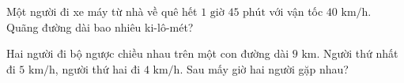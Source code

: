 \begin{ex}
  Một người đi xe máy từ nhà về quê hết $1\text{ giờ } 45\text{ phút}$ với vận tốc $40\text{ km/h}$. Quãng đường dài bao nhiêu ki-lô-mét?
\end{ex}

\begin{ex}
  Hai người đi bộ ngược chiều nhau trên một con đường dài $9\text{ km}$. Người thứ nhất đi $5\text{ km/h}$, người thứ hai đi $4\text{ km/h}$. Sau mấy giờ hai người gặp nhau?
\end{ex}

